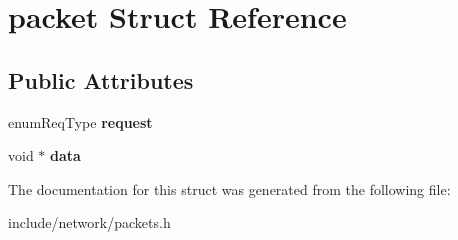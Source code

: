 \hypertarget{structpacket}{\section{packet \-Struct \-Reference}
\label{df/de8/structpacket}
}
\subsection*{\-Public \-Attributes}
\begin{DoxyCompactItemize}
\item 
\hypertarget{structpacket_a89ea3290474a887d116c03acc214f7c8}{enum\-Req\-Type {\bfseries request}}\label{df/de8/structpacket_a89ea3290474a887d116c03acc214f7c8}

\item 
\hypertarget{structpacket_ad3115ffc58cc55bae08635ed965c4768}{void $\ast$ {\bfseries data}}\label{df/de8/structpacket_ad3115ffc58cc55bae08635ed965c4768}

\end{DoxyCompactItemize}


\-The documentation for this struct was generated from the following file\-:\begin{DoxyCompactItemize}
\item 
include/network/packets.\-h\end{DoxyCompactItemize}
